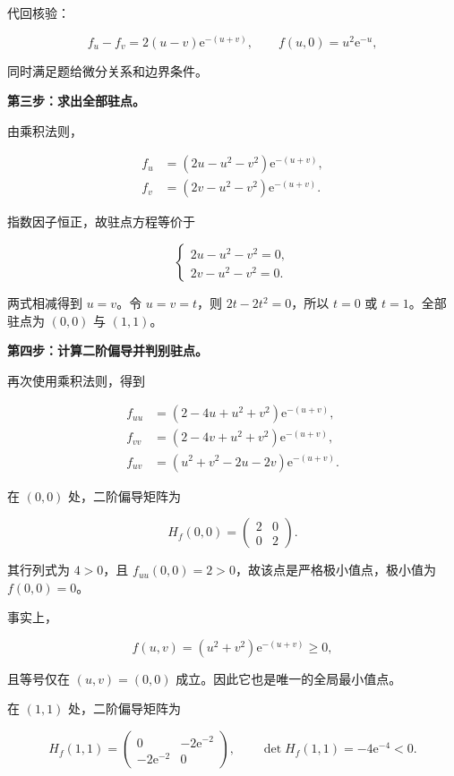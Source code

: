 \documentclass[UTF8,11pt,fontset=windows]{ctexart}
\begin{document}
代回核验：

$$
f_u-f_v=2(u-v)\mathrm e^{-(u+v)},\qquad
f(u,0)=u^2\mathrm e^{-u},
$$

同时满足题给微分关系和边界条件。

\textbf{第三步：求出全部驻点。}

由乘积法则，

$$
\begin{aligned}
f_u&=(2u-u^2-v^2)\mathrm e^{-(u+v)},\\
f_v&=(2v-u^2-v^2)\mathrm e^{-(u+v)}.
\end{aligned}
$$

指数因子恒正，故驻点方程等价于

$$
\begin{cases}2u-u^2-v^2=0,\\2v-u^2-v^2=0.\end{cases}
$$

两式相减得到 $u=v$。令 $u=v=t$，则 $2t-2t^2=0$，所以 $t=0$ 或 $t=1$。全部驻点为 $(0,0)$ 与 $(1,1)$。

\textbf{第四步：计算二阶偏导并判别驻点。}

再次使用乘积法则，得到

$$
\begin{aligned}
f_{uu}&=(2-4u+u^2+v^2)\mathrm e^{-(u+v)},\\
f_{vv}&=(2-4v+u^2+v^2)\mathrm e^{-(u+v)},\\
f_{uv}&=(u^2+v^2-2u-2v)\mathrm e^{-(u+v)}.
\end{aligned}
$$

在 $(0,0)$ 处，二阶偏导矩阵为

$$
H_f(0,0)=\begin{pmatrix}2&0\\0&2\end{pmatrix}.
$$

其行列式为 $4>0$，且 $f_{uu}(0,0)=2>0$，故该点是严格极小值点，极小值为 $f(0,0)=0$。

事实上，

$$
f(u,v)=(u^2+v^2)\mathrm e^{-(u+v)}\ge0,
$$

且等号仅在 $(u,v)=(0,0)$ 成立。因此它也是唯一的全局最小值点。

在 $(1,1)$ 处，二阶偏导矩阵为

$$
H_f(1,1)=\begin{pmatrix}0&-2\mathrm e^{-2}\\-2\mathrm e^{-2}&0\end{pmatrix},
\qquad \det H_f(1,1)=-4\mathrm e^{-4}<0.
$$
\end{document}
